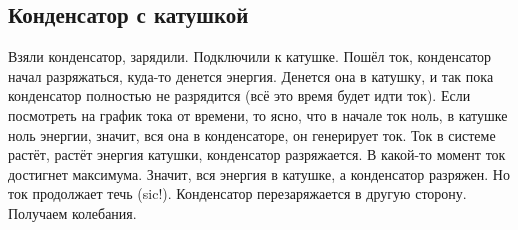 	\subsection{Конденсатор с катушкой}
		Взяли конденсатор, зарядили.
		Подключили к катушке.
		Пошёл ток, конденсатор начал разряжаться, куда-то денется энергия.
		Денется она в катушку, и так пока конденсатор полностью не разрядится (всё это время будет идти ток).
		Если посмотреть на график тока от времени, то ясно, что в начале ток ноль, в катушке ноль энергии,
		значит, вся она в конденсаторе, он генерирует ток.
		Ток в системе растёт, растёт энергия катушки, конденсатор разряжается.
		В какой-то момент ток достигнет максимума.
		Значит, вся энергия в катушке, а конденсатор разряжен.
		Но ток продолжает течь (sic!).
		Конденсатор перезаряжается в другую сторону.
		Получаем колебания.
